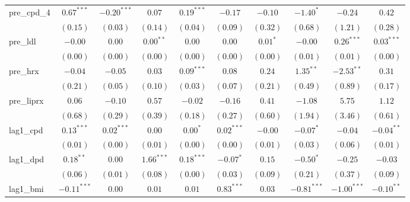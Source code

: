 \begin{tabular}{l c c c c c c c c c}
pre\_cpd\_4      & $0.67^{***}$  & $-0.20^{***}$ & $0.07$        & $0.19^{***}$  & $-0.17$       & $-0.10$        & $-1.40^{*}$   & $-0.24$        & $0.42$         \\
                 & $(0.15)$      & $(0.03)$      & $(0.14)$      & $(0.04)$      & $(0.09)$      & $(0.32)$       & $(0.68)$      & $(1.21)$       & $(0.28)$       \\
pre\_ldl         & $-0.00$       & $0.00$        & $0.00^{**}$   & $0.00$        & $0.00$        & $0.01^{*}$     & $-0.00$       & $0.26^{***}$   & $0.03^{***}$   \\
                 & $(0.00)$      & $(0.00)$      & $(0.00)$      & $(0.00)$      & $(0.00)$      & $(0.00)$       & $(0.01)$      & $(0.01)$       & $(0.00)$       \\
pre\_hrx         & $-0.04$       & $-0.05$       & $0.03$        & $0.09^{***}$  & $0.08$        & $0.24$         & $1.35^{**}$   & $-2.53^{**}$   & $0.31$         \\
                 & $(0.21)$      & $(0.05)$      & $(0.10)$      & $(0.03)$      & $(0.07)$      & $(0.21)$       & $(0.49)$      & $(0.89)$       & $(0.17)$       \\
pre\_liprx       & $0.06$        & $-0.10$       & $0.57$        & $-0.02$       & $-0.16$       & $0.41$         & $-1.08$       & $5.75$         & $1.12$         \\
                 & $(0.68)$      & $(0.29)$      & $(0.39)$      & $(0.18)$      & $(0.27)$      & $(0.60)$       & $(1.94)$      & $(3.46)$       & $(0.61)$       \\
lag1\_cpd        & $0.13^{***}$  & $0.02^{***}$  & $0.00$        & $0.00^{*}$    & $0.02^{***}$  & $-0.00$        & $-0.07^{*}$   & $-0.04$        & $-0.04^{**}$   \\
                 & $(0.01)$      & $(0.00)$      & $(0.01)$      & $(0.00)$      & $(0.00)$      & $(0.01)$       & $(0.03)$      & $(0.06)$       & $(0.01)$       \\
lag1\_dpd        & $0.18^{**}$   & $0.00$        & $1.66^{***}$  & $0.18^{***}$  & $-0.07^{*}$   & $0.15$         & $-0.50^{*}$   & $-0.25$        & $-0.03$        \\
                 & $(0.06)$      & $(0.01)$      & $(0.08)$      & $(0.00)$      & $(0.03)$      & $(0.09)$       & $(0.21)$      & $(0.37)$       & $(0.09)$       \\
lag1\_bmi        & $-0.11^{***}$ & $0.00$        & $0.01$        & $0.01$        & $0.83^{***}$  & $0.03$         & $-0.81^{***}$ & $-1.00^{***}$  & $-0.10^{**}$   \\

\end{tabular}
